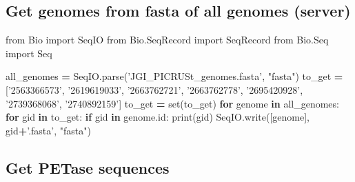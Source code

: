 \documentclass[
]{article}
\newenvironment{Shaded}{\begin{snugshade}}{\end{snugshade}}
\newcommand{\BuiltInTok}[1]{#1}
\newcommand{\ControlFlowTok}[1]{\textcolor[rgb]{0.13,0.29,0.53}{\textbf{#1}}}
\newcommand{\ImportTok}[1]{#1}
\newcommand{\KeywordTok}[1]{\textcolor[rgb]{0.13,0.29,0.53}{\textbf{#1}}}
\newcommand{\NormalTok}[1]{#1}
\newcommand{\OperatorTok}[1]{\textcolor[rgb]{0.81,0.36,0.00}{\textbf{#1}}}
\newcommand{\StringTok}[1]{\textcolor[rgb]{0.31,0.60,0.02}{#1}}
\begin{document}
\hypertarget{get-genomes-from-fasta-of-all-genomes-server}{%
\subsection{Get genomes from fasta of all genomes
(server)}\label{get-genomes-from-fasta-of-all-genomes-server}}

\begin{Shaded}
\begin{Highlighting}[]
\ImportTok{from}\NormalTok{ Bio }\ImportTok{import}\NormalTok{ SeqIO}
\ImportTok{from}\NormalTok{ Bio.SeqRecord }\ImportTok{import}\NormalTok{ SeqRecord}
\ImportTok{from}\NormalTok{ Bio.Seq }\ImportTok{import}\NormalTok{ Seq}

\NormalTok{all_genomes }\OperatorTok{=}\NormalTok{ SeqIO.parse(}\StringTok{'JGI_PICRUSt_genomes.fasta'}\NormalTok{, }\StringTok{"fasta"}\NormalTok{)}
\NormalTok{to_get }\OperatorTok{=}\NormalTok{ [}\StringTok{'2563366573'}\NormalTok{, }\StringTok{'2619619033'}\NormalTok{, }\StringTok{'2663762721'}\NormalTok{, }\StringTok{'2663762778'}\NormalTok{, }\StringTok{'2695420928'}\NormalTok{, }\StringTok{'2739368068'}\NormalTok{, }\StringTok{'2740892159'}\NormalTok{]}
\NormalTok{to_get }\OperatorTok{=} \BuiltInTok{set}\NormalTok{(to_get)}
\ControlFlowTok{for}\NormalTok{ genome }\KeywordTok{in}\NormalTok{ all_genomes:}
  \ControlFlowTok{for}\NormalTok{ gid }\KeywordTok{in}\NormalTok{ to_get:}
    \ControlFlowTok{if}\NormalTok{ gid }\KeywordTok{in}\NormalTok{ genome.}\BuiltInTok{id}\NormalTok{:}
      \BuiltInTok{print}\NormalTok{(gid)}
\NormalTok{      SeqIO.write([genome], gid}\OperatorTok{+}\StringTok{'.fasta'}\NormalTok{, }\StringTok{"fasta"}\NormalTok{)}
\end{Highlighting}
\end{Shaded}

\hypertarget{get-petase-sequences}{%
\subsection{Get PETase sequences}\label{get-petase-sequences}}
\end{document}
